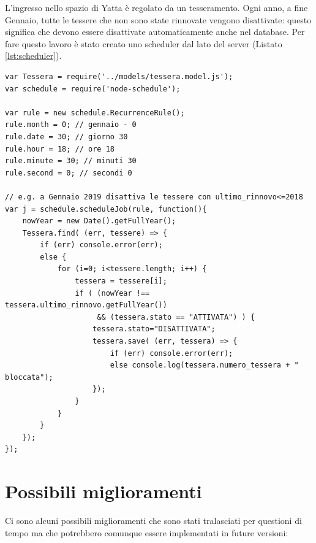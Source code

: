 \documentclass[12pt]{report}
\begin{document}
L'ingresso nello spazio di Yatta è regolato da un tesseramento. Ogni anno, a fine Gennaio, tutte le tessere che non sono state rinnovate vengono disattivate: questo significa che devono essere disattivate automaticamente anche nel database.
Per fare questo lavoro è stato creato uno scheduler dal lato del server (Listato \ref{lst:scheduler}).
\begin{lstlisting}[caption={Implementazione di uno scheduler che disattiva automaticamente le tessere non rinnovate. Questa funzione viene eseguita una volta all'anno e disattiva tutte le tessere ancora attivate e non iscritte all'anno corrente.}, label={lst:scheduler}]
var Tessera = require('../models/tessera.model.js');
var schedule = require('node-schedule');

var rule = new schedule.RecurrenceRule();
rule.month = 0; // gennaio - 0
rule.date = 30; // giorno 30
rule.hour = 18; // ore 18
rule.minute = 30; // minuti 30
rule.second = 0; // secondi 0

// e.g. a Gennaio 2019 disattiva le tessere con ultimo_rinnovo<=2018
var j = schedule.scheduleJob(rule, function(){
	nowYear = new Date().getFullYear();
	Tessera.find( (err, tessere) => {
		if (err) console.error(err);
		else {
			for (i=0; i<tessere.length; i++) {
				tessera = tessere[i];
				if ( (nowYear !== tessera.ultimo_rinnovo.getFullYear()) 
				     && (tessera.stato == "ATTIVATA") ) {
					tessera.stato="DISATTIVATA";
					tessera.save( (err, tessera) => {
						if (err) console.error(err);
						else console.log(tessera.numero_tessera + " bloccata");
					});
				}
			}
		}
	});
});
\end{lstlisting}

%
\section{Possibili miglioramenti}
%

Ci sono alcuni possibili miglioramenti che sono stati tralasciati per questioni di tempo ma che potrebbero comunque essere implementati in future versioni:
\end{document}
